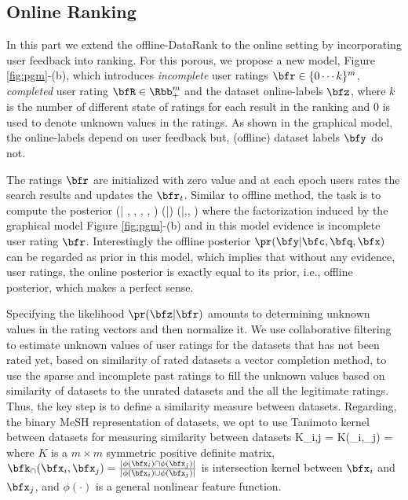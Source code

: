 \documentclass[twoside,11pt]{article}
\begin{document}
\subsection{Online Ranking}
In this part we extend the offline-DataRank to the online setting by incorporating user feedback into ranking. For this porous, we propose a new model, Figure \ref{fig:pgm}-(b), which introduces \emph{incomplete} user ratings $\bfr\in \{0\cdots k \}^{m}$, \emph{completed} user rating $\bfR \in \Rbb_+^m$ and the dataset online-labels $\bfz$, where $k$ is the number of different state of ratings for each result in the ranking and 0 is used to denote unknown values in the ratings. As shown in the graphical model, the online-labels depend on user feedback but, (offline) dataset labels $\bfy$ do not.

The ratings $\bfr$ are initialized with zero value and at each epoch users rates the search results and updates the $\bfr_t$. Similar to offline method, the task is to compute the posterior
\beq \label{eq:online-posterior}
\pr (\bfz | \bfr, \bfy, \bfc, \bfq, \bfx)  \propto  \pr (\bfz |\bfr) \pr (\bfy |\bfc,\bfq, \bfx)
\eeq
where the factorization induced by the graphical model Figure \ref{fig:pgm}-(b) and in this model evidence is incomplete user rating $\bfr$. Interestingly the offline posterior $\pr (\bfy |\bfc,\bfq, \bfx)$ can be regarded as prior in this model, which implies that without any evidence, user ratings, the online posterior is exactly equal to its prior, i.e., offline posterior, which makes a perfect sense.

Specifying the likelihood $\pr (\bfz |\bfr)$ amounts to determining unknown values in the rating vectors and then normalize it.
We use collaborative filtering \cite{CF-survey} to estimate unknown values of user ratings for the datasets that has not been rated yet, based on similarity of rated datasets  a vector completion method, to use the sparse and incomplete past ratings to fill the unknown values based on similarity of datasets to the unrated datasets and the all the legitimate ratings. Thus, the key step is to define a similarity measure between datasets. 
Regarding, the binary MeSH representation of datasets, we opt to use Tanimoto kernel \cite{t-kernel} between datasets for measuring similarity between datasets
\beq
K_{i,j} = K(\bfx_i,\bfx_j) =  
\eeq
where $K$ is a $m \times m$ symmetric positive definite matrix, $\bfk_\cap(\bfx_i,\bfx_j)=\frac{|\phi(\bfx_i) \cap \phi(\bfx_j) |}{|\phi(\bfx_i) \cup \phi(\bfx_j)| }$ is intersection kernel \cite{i-kernel} between $\bfx_i$ and $\bfx_j$, and $\phi(\cdot)$ is a general nonlinear feature function. 
\end{document}
